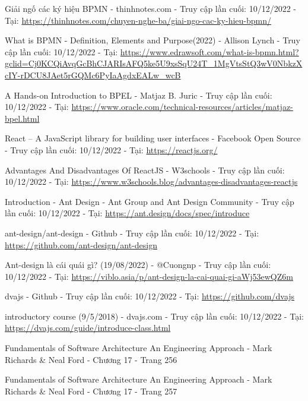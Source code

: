 
\begin{thebibliography}{9}
    Giải ngố các ký hiệu BPMN - thinhnotes.com - Truy cập lần cuối: 10/12/2022 - Tại: \url{https://thinhnotes.com/chuyen-nghe-ba/giai-ngo-cac-ky-hieu-bpmn/}

    What is BPMN - Definition, Elements and Purpose(2022) - Allison Lynch - Truy cập lần cuối: 10/12/2022 - Tại: \url{https://www.edrawsoft.com/what-is-bpmn.html?gclid=Cj0KCQiAvqGcBhCJARIsAFQ5ke5U9xsSqU24T_1MgVtsStQ3wV0NbkzXcIY-rDCU8JAet5rGQMc6PyIaAgdxEALw_wcB}

    A Hands-on Introduction to BPEL - Matjaz B. Juric - Truy cập lần cuối: 10/12/2022 - Tại: \url{https://www.oracle.com/technical-resources/articles/matjaz-bpel.html}

    React – A JavaScript library for building user interfaces - Facebook Open Source - Truy cập lần cuối: 10/12/2022 - Tại: \url{https://reactjs.org/}

    Advantages And Disadvantages Of ReactJS - W3schools - Truy cập lần cuối: 10/12/2022 - Tại: \url{https://www.w3schools.blog/advantages-disadvantages-reactjs}

    Introduction - Ant Design - Ant Group and Ant Design Community - Truy cập lần cuối: 10/12/2022 - Tại: \url{https://ant.design/docs/spec/introduce}

    ant-design/ant-design - Github - Truy cập lần cuối: 10/12/2022 - Tại: \url{https://github.com/ant-design/ant-design}

    Ant-design là cái quái gì? (19/08/2022) - @Cuongnp - Truy cập lần cuối: 10/12/2022 - Tại: \url{https://viblo.asia/p/ant-design-la-cai-quai-gi-aWj53ewQZ6m}

    dvajs - Github - Truy cập lần cuối: 10/12/2022 - Tại: \url{https://github.com/dvajs}

    introductory course (9/5/2018) - dvajs.com - Truy cập lần cuối: 10/12/2022 - Tại: \url{https://dvajs.com/guide/introduce-class.html}

    Fundamentals of Software Architecture An Engineering Approach - Mark Richards \& Neal Ford - Chương 17 - Trang 256
    
    Fundamentals of Software Architecture An Engineering Approach - Mark Richards \& Neal Ford - Chương 17 - Trang 257

\end{thebibliography}